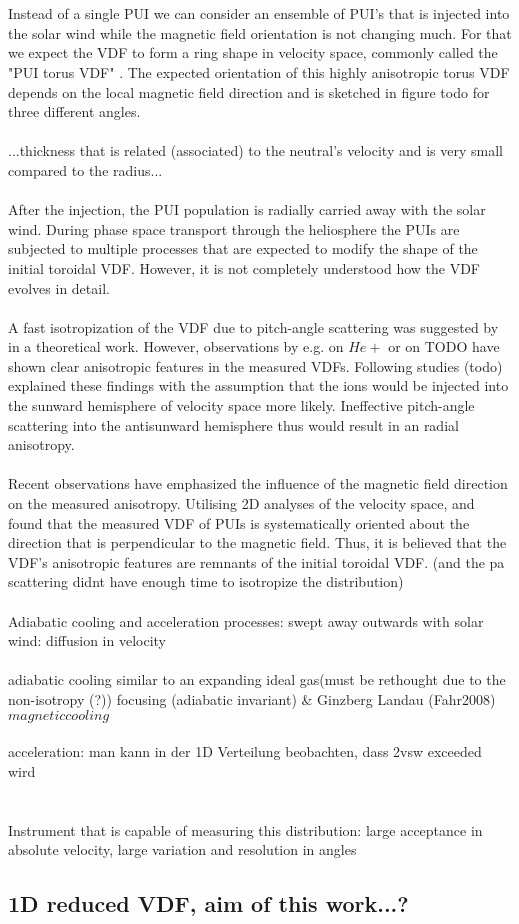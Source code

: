 \\ \\
Instead of a single PUI we can consider an ensemble of PUI's that is injected into the solar wind while the magnetic field orientation is not changing much. For that we expect the VDF to form a ring shape in velocity space, commonly called the "PUI torus VDF" \citep{oka_2002}.
The expected orientation of this highly anisotropic torus VDF depends on the local magnetic field direction and is sketched in figure todo for three different angles.
\\ \\
...thickness that is related (associated) to the neutral's velocity and is very small compared to the radius...
\\ \\
After the injection, the PUI population is radially carried away with the solar wind. During phase space transport through the heliosphere the PUIs are subjected to multiple processes that are expected to modify the shape of the initial toroidal VDF. However, it is not completely understood how the VDF evolves in detail.
\\ \\
A fast isotropization of the VDF due to pitch-angle scattering was suggested by \citet{vasyl_siscoe_1976} in a theoretical work.
However, observations by e.g. \citet{moebius_98} on $He+$ or \citet{gloeckler_1995} on TODO have shown clear anisotropic features in the measured VDFs.
Following studies (todo) explained these findings with the assumption that the ions would be injected into the sunward hemisphere of velocity space more likely. Ineffective pitch-angle scattering into the antisunward hemisphere thus would result in an radial anisotropy.
\\ \\
Recent observations have emphasized the influence of the magnetic field direction on the measured anisotropy.
Utilising 2D analyses of the velocity space, \citet{oka_2002} and \citet{drews_2015} found that the measured VDF of PUIs is systematically oriented about the direction that is perpendicular to the magnetic field.
Thus, it is believed that the VDF's anisotropic features are remnants of the initial toroidal VDF. (and the pa scattering didnt have enough time to isotropize the distribution)
\\ \\
Adiabatic cooling and acceleration processes:
swept away outwards with solar wind:
diffusion in velocity\\ \\
adiabatic cooling similar to an expanding ideal gas(must be rethought due to the non-isotropy (?))
focusing (adiabatic invariant) \& Ginzberg Landau (Fahr2008) $magnetic cooling$\\ \\
acceleration: 
man kann in der 1D Verteilung beobachten, dass 2vsw exceeded wird
\\ \\ \\

Instrument that is capable of measuring this distribution: large acceptance in absolute velocity, large variation and resolution in angles

\subsection{1D reduced VDF, aim of this work...?}
